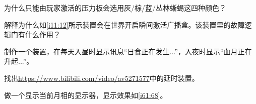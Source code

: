 \begin{problemset}[思考题]
\item 为什么只能由玩家激活的压力板会选用灰/棕/蓝/丛林蜥蜴这四种颜色？
\item 解释为什么如\autoref{i11:12}所示装置会在世界开启瞬间激活广播盒。该装置里的故障逻辑门有什么作用？
\begin{figure}[!ht]
\begin{center}
\end{center}
\caption{}
\label{i11:12}
\end{figure}
\item 制作一个装置，在每天入昼时显示讯息“日食正在发生...”，入夜时显示“血月正在升起...”。
\item 找出\url{https://www.bilibili.com/video/av5271577}中的延时装置。
\item 做一个显示当前月相的显示器，显示效果如\autoref{i61:68}。
\begin{figure}[!ht]
\begin{center}
\end{center}
\end{figure}
\end{problemset}
